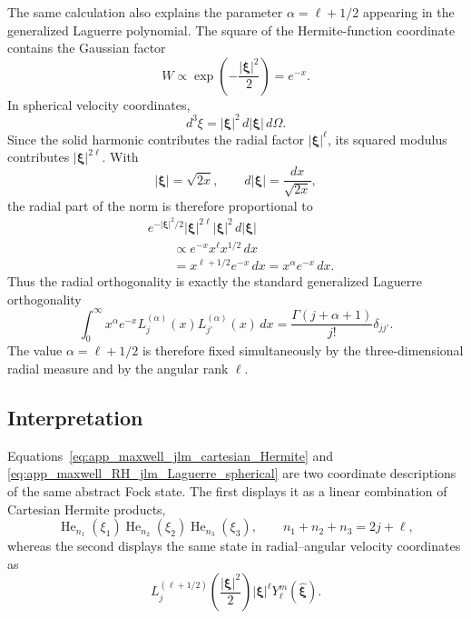 \documentclass[11pt,oneside]{article}
\numberwithin{equation}{section}
\theoremstyle{definition}
\begin{document}
The same calculation also explains the parameter
$\alpha=\ell+1/2$ appearing in the generalized Laguerre polynomial.
The square of the Hermite-function coordinate contains the Gaussian factor
\begin{equation}
W\propto
\exp\!\left(-\frac{|\bm\xi|^2}{2}\right)
=
e^{-x}.
\end{equation}
In spherical velocity coordinates,
\begin{equation}
d^3\xi
=
|\bm\xi|^2\,d|\bm\xi|\,d\Omega.
\end{equation}
Since the solid harmonic contributes the radial factor
$|\bm\xi|^\ell$, its squared modulus contributes
$|\bm\xi|^{2\ell}$.  With
\begin{equation}
|\bm\xi|=\sqrt{2x},
\qquad
d|\bm\xi|
=
\frac{dx}{\sqrt{2x}},
\end{equation}
the radial part of the norm is therefore proportional to
\begin{align}
&
e^{-|\bm\xi|^2/2}
|\bm\xi|^{2\ell}
|\bm\xi|^2\,d|\bm\xi|
\nonumber\\
&\qquad\propto
e^{-x}
x^\ell x^{1/2}\,dx
\nonumber\\
&\qquad=
x^{\ell+1/2}e^{-x}\,dx
=
x^\alpha e^{-x}\,dx.
\end{align}
Thus the radial orthogonality is exactly the standard generalized
Laguerre orthogonality
\begin{equation}
\int_0^\infty
x^\alpha e^{-x}
L_j^{(\alpha)}(x)
L_{j'}^{(\alpha)}(x)\,dx
=
\frac{\Gamma(j+\alpha+1)}{j!}
\delta_{jj'}.
\label{eq:app_maxwell_Laguerre_orthogonality}
\end{equation}
The value $\alpha=\ell+1/2$ is therefore fixed simultaneously by the
three-dimensional radial measure and by the angular rank $\ell$.

\subsection{Interpretation}

Equations~\eqref{eq:app_maxwell_jlm_cartesian_Hermite} and
\eqref{eq:app_maxwell_RH_jlm_Laguerre_spherical} are two coordinate
descriptions of the same abstract Fock state.  The first displays it as a
linear combination of Cartesian Hermite products,
\begin{equation}
\operatorname{He}_{n_1}(\xi_1)
\operatorname{He}_{n_2}(\xi_2)
\operatorname{He}_{n_3}(\xi_3),
\qquad
n_1+n_2+n_3=2j+\ell,
\end{equation}
whereas the second displays the same state in radial--angular velocity
coordinates as
\begin{equation}
L_j^{(\ell+1/2)}
\left(
\frac{|\bm\xi|^2}{2}
\right)
|\bm\xi|^\ell
Y_\ell^m(\widehat{\bm\xi}).
\end{equation}
\end{document}
